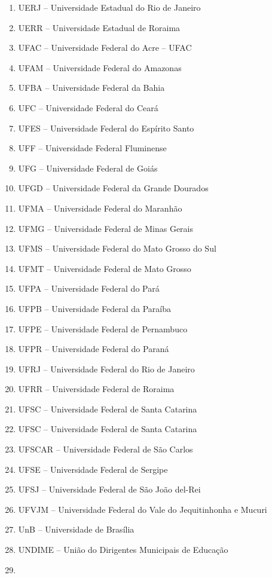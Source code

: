 \documentclass[
]{book}
\begin{document}
\begin{enumerate}
\item
  UERJ -- Universidade Estadual do Rio de Janeiro
\item
  UERR -- Universidade Estadual de Roraima
\item
  UFAC -- Universidade Federal do Acre -- UFAC
\item
  UFAM -- Universidade Federal do Amazonas
\item
  UFBA -- Universidade Federal da Bahia
\item
  UFC -- Universidade Federal do Ceará
\item
  UFES -- Universidade Federal do Espírito Santo
\item
  UFF -- Universidade Federal Fluminense
\item
  UFG -- Universidade Federal de Goiás
\item
  UFGD -- Universidade Federal da Grande Dourados
\item
  UFMA -- Universidade Federal do Maranhão
\item
  UFMG -- Universidade Federal de Minas Gerais
\item
  UFMS -- Universidade Federal do Mato Grosso do Sul
\item
  UFMT -- Universidade Federal de Mato Grosso
\item
  UFPA -- Universidade Federal do Pará
\item
  UFPB -- Universidade Federal da Paraíba
\item
  UFPE -- Universidade Federal de Pernambuco
\item
  UFPR -- Universidade Federal do Paraná
\item
  UFRJ -- Universidade Federal do Rio de Janeiro
\item
  UFRR -- Universidade Federal de Roraima
\item
  UFSC -- Universidade Federal de Santa Catarina
\item
  UFSC -- Universidade Federal de Santa Catarina
\item
  UFSCAR -- Universidade Federal de São Carlos
\item
  UFSE -- Universidade Federal de Sergipe
\item
  UFSJ -- Universidade Federal de São João del-Rei
\item
  UFVJM -- Universidade Federal do Vale do Jequitinhonha e Mucuri
\item
  UnB -- Universidade de Brasília
\item
  UNDIME -- União do Dirigentes Municipais de Educação
\item

\end{enumerate}
\end{document}
